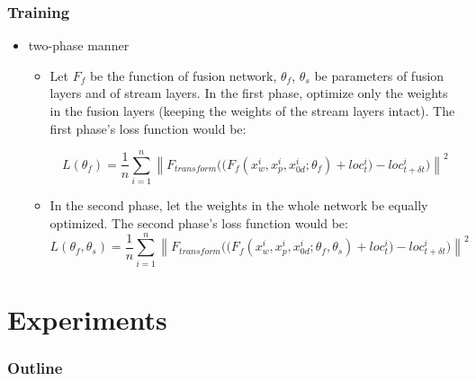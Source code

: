 \documentclass{beamer}
\begin{document}
\begin{frame}
\frametitle{Training}
\begin{itemize}
	\item  two-phase manner
	\begin{itemize}
		\item  Let $F_{f}$ be the function of fusion network, $\theta_{f}$, $\theta_{s}$ be parameters of fusion layers and of stream layers. In the first phase, optimize only the weights in the fusion layers (keeping the weights of the stream layers intact). The first phase's loss function would be:
		
		\begin{equation}
		\label{eq_fusion_1}
		L(\theta_{f}) = \frac{1}{n}\sum_{i=1}^{n} \left \| {F_{transform}((F_{f}(x_w^i, x_p^i, x_{0d}^i; \theta_{f})} + loc^i_{t} ) - loc^i_{t+\delta t} ) \right \| ^2
		\end{equation}
		\item In the second phase, let the weights in the whole network be equally optimized. The second phase's loss function would be:
		\begin{equation}
		\label{eq_fusion_2}
		L(\theta_{f}, \theta_{s}) = \frac{1}{n}\sum_{i=1}^{n} \left \| {F_{transform}((F_{f}(x_w^i, x_p^i, x_{0d}^i; \theta_{f}, \theta_{s})} + loc^i_{t} ) - loc^i_{t+\delta t} ) \right \| ^2
		\end{equation}
		
	\end{itemize}
\end{itemize}
\end{frame}

\section{Experiments}
\begin{frame}
\frametitle{Outline} %
\tableofcontents[currentsubsection] %
\end{frame}
\end{document}
